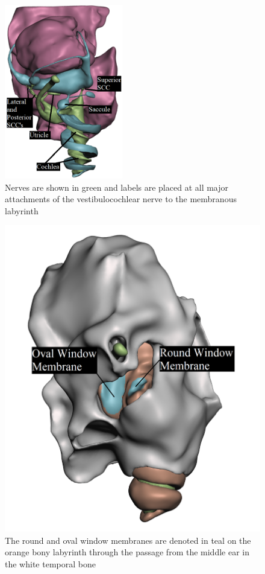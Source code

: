 \documentclass[10pt]{article}
\begin{document}
\begin{figure}[H]
	\centering
	\includegraphics[height=3in]{nervous}
	\caption{Nerves are shown in green and labels are placed at all major attachments of the vestibulocochlear nerve to the membranous labyrinth}
	\label{nvs}
\end{figure}

\begin{figure}[H]
	\centering
	\includegraphics[width=\linewidth]{wm}
	\caption{The round and oval window membranes are denoted in teal on the orange bony labyrinth through the passage from the middle ear in the white temporal bone}
	\label{wm}
\end{figure}
\end{document}
